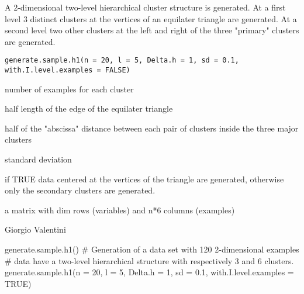 \documentclass{article}
\begin{document}
\begin{Description}\relax
A 2-dimensional two-level hierarchical cluster structure is generated.
At a first level 3 distinct clusters at the vertices of an equilater triangle are generated.
At a second level two other clusters at the left and right of the three "primary" clusters are generated.
\end{Description}
\begin{Usage}
\begin{verbatim}
generate.sample.h1(n = 20, l = 5, Delta.h = 1, sd = 0.1, with.I.level.examples = FALSE)
\end{verbatim}
\end{Usage}
\begin{Arguments}
\begin{ldescription}
\item[\code{n}] number of examples for each cluster
\item[\code{l}] half length of the edge of the equilater triangle 
\item[\code{Delta.h}] half of the "abscissa" distance between each pair of clusters inside the three major clusters 
\item[\code{sd}] standard deviation 
\item[\code{with.I.level.examples}] if TRUE data centered at the vertices of the triangle are generated, otherwise only the secondary clusters are generated. 
\end{ldescription}
\end{Arguments}
\begin{Value}
a matrix with dim rows (variables) and n*6 columns (examples)
\end{Value}
\begin{Author}\relax
Giorgio Valentini 
\end{Author}
\begin{Examples}
\begin{ExampleCode}
generate.sample.h1()
# Generation of a data set with 120 2-dimensional examples
# data have a two-level hierarchical structure with respectively 3 and 6 clusters. 
generate.sample.h1(n = 20, l = 5, Delta.h = 1, sd = 0.1, with.I.level.examples = TRUE)
\end{ExampleCode}
\end{Examples}
\end{document}
